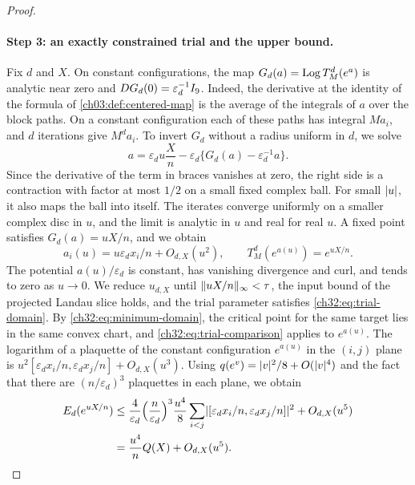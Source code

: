 \begin{proof}
\paragraph{Step 3: an exactly constrained trial and the upper bound.}
Fix $d$ and $X$. On constant configurations, the map $G_d(a)=\operatorname{Log} T_M^d(e^a)$ is analytic near zero and $DG_d(0)=\varepsilon_d^{-1}I_9$. Indeed, the derivative at the identity of the formula of \cref{ch03:def:centered-map} is the average of the integrals of $a$ over the block paths. On a constant configuration each of these paths has integral $Ma_i$, and $d$ iterations give $M^da_i$. To invert $G_d$ without a radius uniform in $d$, we solve
\[
 a=\varepsilon_du\frac Xn-\varepsilon_d\bigl\{G_d(a)-\varepsilon_d^{-1}a\bigr\}.
\]
Since the derivative of the term in braces vanishes at zero, the right side is a contraction with factor at most $1/2$ on a small fixed complex ball. For small $\lvert u\rvert$, it also maps the ball into itself. The iterates converge uniformly on a smaller complex disc in $u$, and the limit is analytic in $u$ and real for real $u$. A fixed point satisfies $G_d(a)=uX/n$, and we obtain
\begin{equation}\label{ch32:eq:exact-trial}
 a_i(u)=u\varepsilon_dx_i/n+O_{d,X}(u^2),\qquad T_M^d(e^{a(u)})=e^{uX/n}.
\end{equation}
The potential $a(u)/\varepsilon_d$ is constant, has vanishing divergence and curl, and tends to zero as $u\to0$. We reduce $u_{d,X}$ until $\lVert uX/n\rVert_\infty<\tau$, the input bound of the projected Landau slice holds, and the trial parameter satisfies \eqref{ch32:eq:trial-domain}. By \eqref{ch32:eq:minimum-domain}, the critical point for the same target lies in the same convex chart, and \eqref{ch32:eq:trial-comparison} applies to $e^{a(u)}$. The logarithm of a plaquette of the constant configuration $e^{a(u)}$ in the $(i,j)$ plane is $u^2[\varepsilon_dx_i/n,\varepsilon_dx_j/n]+O_{d,X}(u^3)$. Using $q(e^v)=\lvert v\rvert^2/8+O(\lvert v\rvert^4)$ and the fact that there are $(n/\varepsilon_d)^3$ plaquettes in each plane, we obtain
\begin{equation}\label{ch32:eq:quartic-upper}
 \begin{split}
 E_d(e^{uX/n})
 &\le\frac4{\varepsilon_d}\Bigl(\frac n{\varepsilon_d}\Bigr)^3\frac{u^4}8\sum_{i<j}\lvert [\varepsilon_dx_i/n,\varepsilon_dx_j/n]\rvert^2+O_{d,X}(u^5)\\
 &=\frac{u^4}nQ(X)+O_{d,X}(u^5).
 \end{split}
\end{equation}


\end{proof}
